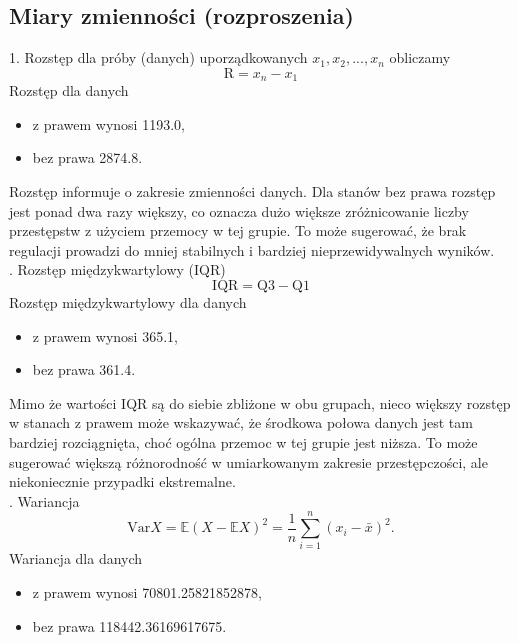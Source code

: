 \documentclass[a4paper,12pt]{article}
\begin{document}
	\subsection{Miary zmienności (rozproszenia)}
	1. Rozstęp dla próby (danych) uporządkowanych $x_1, x_2, ..., x_n$ obliczamy
	\begin{equation}
		\text{R} = x_n - x_1
	\end{equation}
	Rozstęp dla danych
	\begin{itemize}[itemsep=5pt,parsep=0pt]
		\item z prawem wynosi 1193.0,
		\item bez prawa 2874.8.
	\end{itemize}
	Rozstęp informuje o zakresie zmienności danych. Dla stanów bez prawa rozstęp jest ponad dwa razy większy, co oznacza dużo większe zróżnicowanie liczby przestępstw z użyciem przemocy w tej grupie. To może sugerować, że brak regulacji prowadzi do mniej stabilnych i bardziej nieprzewidywalnych wyników. \\
	
	. Rozstęp międzykwartylowy (IQR)
	\begin{equation}
		\text{IQR} = \text{Q3} - \text{Q1}
	\end{equation}
	Rozstęp międzykwartylowy dla danych
	\begin{itemize}[itemsep=5pt,parsep=0pt]
		\item z prawem wynosi 365.1,
		\item bez prawa 361.4.
	\end{itemize}
	Mimo że wartości IQR są do siebie zbliżone w obu grupach, nieco większy rozstęp w stanach z prawem może wskazywać, że środkowa połowa danych jest tam bardziej rozciągnięta, choć ogólna przemoc w tej grupie jest niższa. To może sugerować większą różnorodność w umiarkowanym zakresie przestępczości, ale niekoniecznie przypadki ekstremalne. \\
	
	. Wariancja
	\begin{equation}
		\text{Var}X = \mathbb{E}(X - \mathbb{E}X)^2 = \frac{1}{n} \sum_{i=1}^{n} (x_i - \bar x)^2.
	\end{equation}
	Wariancja dla danych
	\begin{itemize}[itemsep=5pt,parsep=0pt]
		\item z prawem wynosi 70801.25821852878,
		\item bez prawa 118442.36169617675.
	\end{itemize}
	
\end{document}

